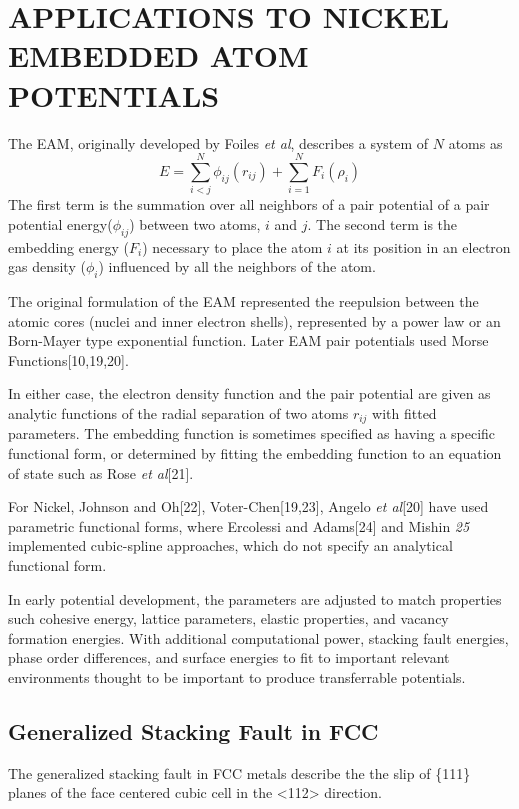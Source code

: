 \chapter{APPLICATIONS TO NICKEL EMBEDDED ATOM POTENTIALS}

The EAM, originally developed by Foiles \emph{et al}, describes a system of $N$ atoms as
\begin{equation}
  E=\sum_{i<j}^{N}\phi_{ij}(r_{ij})
    +\sum_{i=1}^{N}F_{i}(\rho_{i})
\end{equation}
The first term is the summation over all neighbors of a pair potential of a pair potential energy($\phi_{ij}$) between two atoms, $i$ and $j$.  The second term is the embedding energy ($F_i$) necessary to place the atom $i$ at its position in an electron gas density ($\phi_i$) influenced by all the neighbors of the atom.

The original formulation of the EAM represented the reepulsion between the atomic cores (nuclei and inner electron shells), represented by a power law or an Born-Mayer type exponential function.  Later EAM pair potentials used Morse Functions[10,19,20].

In either case, the electron density function and the pair potential are given as analytic functions of the radial separation of two atoms $r_{ij}$ with fitted parameters.  The embedding function is sometimes specified as having a specific functional form, or determined by fitting the embedding function to an equation of state such as Rose \emph{et al}[21].

For Nickel, Johnson and Oh[22], Voter-Chen[19,23], Angelo \emph{et al}[20] have used parametric functional forms, where Ercolessi and Adams[24] and Mishin \emph{25} implemented cubic-spline approaches, which do not specify an analytical functional form.

In early potential development, the parameters are adjusted to match properties such cohesive energy, lattice parameters, elastic properties, and vacancy formation energies.  With additional computational power, stacking fault energies, phase order differences, and surface energies to fit to important relevant environments thought to be important to produce transferrable potentials.

\section{Generalized Stacking Fault in FCC}
The generalized stacking fault in FCC metals describe the the slip of \{111\} planes of the face centered cubic cell in the <112> direction.

